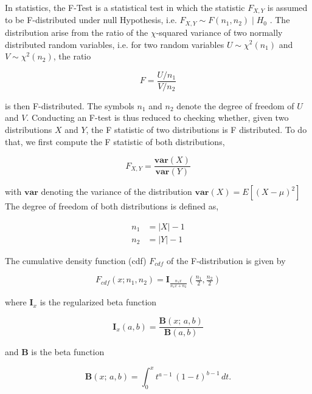 \documentclass[pdftex,12pt,a4paper]{report}
\begin{document}
In statistics, the F-Test is a statistical test in which the statistic $F_{X,Y} $ is assumed to be F-distributed under null Hypothesis, i.e. $F_{X,Y} \sim F(n_1, n_2) \mid  H_0$ \cite{fahrmeir2016statistik}. The distribution arise from the ratio of the $\chi$-squared variance of two normally distributed random variables, i.e. for two random variables $U \sim \chi^2(n_1)$  and $V \sim \chi^2(n_2)$, the ratio

\begin{equation}
F = \frac{U / n_1}{V / n_2}
\end{equation}

is then F-distributed. The symbols $n_1$ and $n_2$ denote the degree of freedom of $U$ and $V$. Conducting an F-test is thus reduced to checking whether, given two distributions $X$ and $Y$, the F statistic of two distributions is F distributed. To do that, we first compute the F statistic  of both distributions, 

\begin{equation}
F_{X,Y} = \frac{\mathbf{var}(X)}{\mathbf{var}(Y)}
\end{equation}

with $\mathbf{var}$ denoting the variance of the distribution $\mathbf{var}(X) = E[(X - \mu)^2]$
The degree of freedom of both distributions is defined as,

\begin{align}
  n_1 &= \vert X \vert - 1 \label{eq:ftest_dof_x} \\
  n_2 &= \vert Y \vert - 1\label{eq:ftest_dof_y}
\end{align}

The cumulative density function (cdf) $F_{cdf}$ of the F-distribution is given by

\begin{equation}
F_{cdf}(x; n_1, n_2)= \mathbf{I}_{\frac{n_1 x}{n_1 x + n_2}}\left (\tfrac{n_1}{2}, \tfrac{n_2}{2} \right)
\end{equation}

where $\mathbf{I}_x$ is the regularized beta function

\begin{equation}
\mathbf{I}_x(a,b) = \frac{\mathbf{B}(x;\,a,b)}{\mathbf{B}(a,b)}
\end{equation}

and $\mathbf{B}$ is the beta function

\begin{equation}
\mathbf{B}(x;\,a,b) = \int_0^x t^{a-1}\,(1-t)^{b-1}\,dt.
\end{equation}
\end{document}
